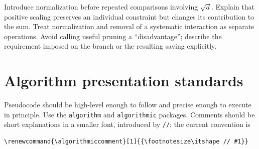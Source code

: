 \documentclass[11pt,a4paper]{article}
\begin{document}
Introduce normalization before repeated comparisons involving
$\sqrt d$. Explain that positive scaling preserves an individual
constraint but changes its contribution to the sum. Treat normalization
and removal of a systematic interaction as separate operations.
Avoid calling useful pruning a ``disadvantage''; describe the requirement
imposed on the branch or the resulting saving explicitly.

\section{Algorithm presentation standards}

Pseudocode should be high-level enough to follow and precise enough to
execute in principle. Use the \texttt{algorithm} and \texttt{algorithmic}
packages. Comments should be short explanations in a smaller font,
introduced by \texttt{//}; the current convention is
\begin{verbatim}
\renewcommand{\algorithmiccomment}[1]{{\footnotesize\itshape // #1}}
\end{verbatim}
\end{document}
